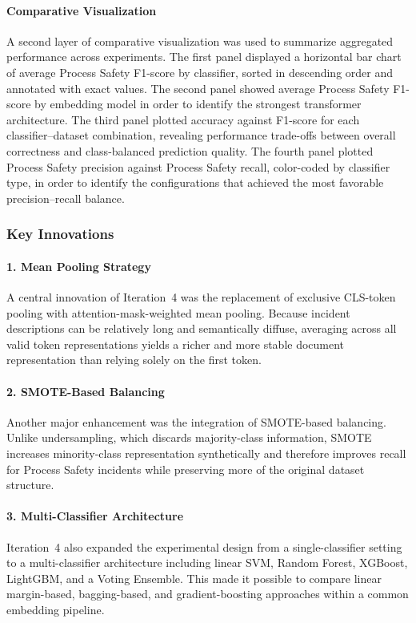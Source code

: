 \documentclass[11pt, titlepage, bibliography=totoc]{scrreprt}
\begin{document}
\paragraph{Comparative Visualization}
A second layer of comparative visualization was used to summarize aggregated performance across experiments. The first panel displayed a horizontal bar chart of average Process Safety F1-score by classifier, sorted in descending order and annotated with exact values. The second panel showed average Process Safety F1-score by embedding model in order to identify the strongest transformer architecture. The third panel plotted accuracy against F1-score for each classifier--dataset combination, revealing performance trade-offs between overall correctness and class-balanced prediction quality. The fourth panel plotted Process Safety precision against Process Safety recall, color-coded by classifier type, in order to identify the configurations that achieved the most favorable precision--recall balance.

\subsubsection{Key Innovations}

\paragraph{1. Mean Pooling Strategy}
A central innovation of Iteration~4 was the replacement of exclusive CLS-token pooling with attention-mask-weighted mean pooling. Because incident descriptions can be relatively long and semantically diffuse, averaging across all valid token representations yields a richer and more stable document representation than relying solely on the first token.

\paragraph{2. SMOTE-Based Balancing}
Another major enhancement was the integration of SMOTE-based balancing. Unlike undersampling, which discards majority-class information, SMOTE increases minority-class representation synthetically and therefore improves recall for Process Safety incidents while preserving more of the original dataset structure.

\paragraph{3. Multi-Classifier Architecture}
Iteration~4 also expanded the experimental design from a single-classifier setting to a multi-classifier architecture including linear SVM, Random Forest, XGBoost, LightGBM, and a Voting Ensemble. This made it possible to compare linear margin-based, bagging-based, and gradient-boosting approaches within a common embedding pipeline.
\end{document}
